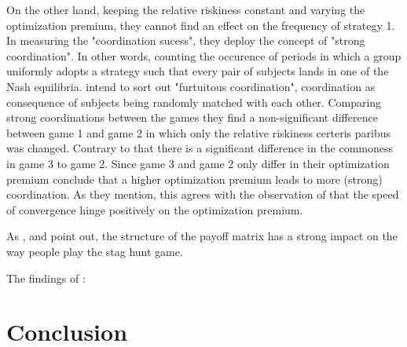 \documentclass[12pt]{article}
\begin{document}
On the other hand, keeping the relative riskiness constant and varying the
optimization premium, they cannot find an effect on the frequency of 
strategy 1. 
In measuring the "coordination sucess", they deploy the concept of "strong
coordination". 
In other words, counting the occurence of periods in which a group
uniformly adopts a strategy such that every pair of subjects lands in one
of the Nash equilibria. \textcite{dubois_optimization_2012} intend to sort 
out "furtuitous coordination", coordination as consequence of subjects being
randomly matched with each other. Comparing strong coordinations between the
games they find a non-significant difference between game 1 and game 2 in 
which only the relative riskiness certeris paribus was changed. Contrary to 
that there is a significant difference in the commoness in game 3 to game 2.
Since game 3 and game 2 only differ in their optimization premium 
\textcite{dubois_optimization_2012} conclude that a higher optimization
premium leads to more (strong) coordination. As they mention, this agrees
with the observation of \textcite{battalio_optimization_2001} that the 
speed of convergence hinge positively on the optimization premium. 

As \textcite{battalio_optimization_2001}, \textcite{schmidt_playing_2003} and
\textcite{dubois_optimization_2012} point out, the structure of the payoff 
matrix has a strong impact on the way people play the stag hunt game.  

The findings of :




\section{Conclusion}
\end{document}
